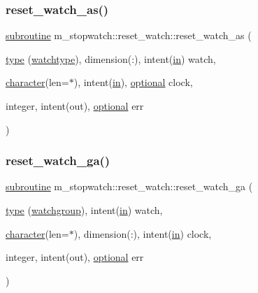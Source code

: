 \subsubsection{\texorpdfstring{reset\+\_\+watch\+\_\+as()}{reset\_watch\_as()}}
{\footnotesize\ttfamily \hyperlink{M__stopwatch_83_8txt_acfbcff50169d691ff02d4a123ed70482}{subroutine} m\+\_\+stopwatch\+::reset\+\_\+watch\+::reset\+\_\+watch\+\_\+as (\begin{DoxyParamCaption}\item[{\hyperlink{stop__watch_83_8txt_a70f0ead91c32e25323c03265aa302c1c}{type} (\hyperlink{structm__stopwatch_1_1watchtype}{watchtype}), dimension(\+:), intent(\hyperlink{M__journal_83_8txt_afce72651d1eed785a2132bee863b2f38}{in})}]{watch,  }\item[{\hyperlink{option__stopwatch_83_8txt_abd4b21fbbd175834027b5224bfe97e66}{character}(len=$\ast$), intent(\hyperlink{M__journal_83_8txt_afce72651d1eed785a2132bee863b2f38}{in}), \hyperlink{option__stopwatch_83_8txt_aa4ece75e7acf58a4843f70fe18c3ade5}{optional}}]{clock,  }\item[{integer, intent(out), \hyperlink{option__stopwatch_83_8txt_aa4ece75e7acf58a4843f70fe18c3ade5}{optional}}]{err }\end{DoxyParamCaption})\hspace{0.3cm}{\ttfamily [private]}}

\mbox{\label{interfacem__stopwatch_1_1reset__watch_a4fd01f66023a3d9183ea5171585d3df9}} 
\subsubsection{\texorpdfstring{reset\+\_\+watch\+\_\+ga()}{reset\_watch\_ga()}}
{\footnotesize\ttfamily \hyperlink{M__stopwatch_83_8txt_acfbcff50169d691ff02d4a123ed70482}{subroutine} m\+\_\+stopwatch\+::reset\+\_\+watch\+::reset\+\_\+watch\+\_\+ga (\begin{DoxyParamCaption}\item[{\hyperlink{stop__watch_83_8txt_a70f0ead91c32e25323c03265aa302c1c}{type} (\hyperlink{structm__stopwatch_1_1watchgroup}{watchgroup}), intent(\hyperlink{M__journal_83_8txt_afce72651d1eed785a2132bee863b2f38}{in})}]{watch,  }\item[{\hyperlink{option__stopwatch_83_8txt_abd4b21fbbd175834027b5224bfe97e66}{character}(len=$\ast$), dimension(\+:), intent(\hyperlink{M__journal_83_8txt_afce72651d1eed785a2132bee863b2f38}{in})}]{clock,  }\item[{integer, intent(out), \hyperlink{option__stopwatch_83_8txt_aa4ece75e7acf58a4843f70fe18c3ade5}{optional}}]{err }\end{DoxyParamCaption})\hspace{0.3cm}{\ttfamily [private]}}

